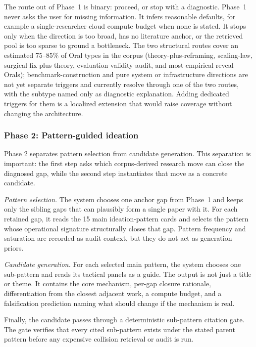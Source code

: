 \documentclass[10pt,a4paper]{article}
\begin{document}
The route out of Phase~1 is binary: proceed, or stop with a diagnostic. Phase~1 never asks the user for missing information. It infers reasonable defaults, for example a single-researcher cloud compute budget when none is stated. It stops only when the direction is too broad, has no literature anchor, or the retrieved pool is too sparse to ground a bottleneck. The two structural routes cover an estimated 75--85\% of Oral types in the corpus (theory-plus-reframing, scaling-law, surgical-fix-plus-theory, evaluation-validity-audit, and most empirical-reveal Orals); benchmark-construction and pure system or infrastructure directions are not yet separate triggers and currently resolve through one of the two routes, with the subtype named only as diagnostic explanation. Adding dedicated triggers for them is a localized extension that would raise coverage without changing the architecture.

\subsubsection{Phase 2: Pattern-guided ideation}

Phase 2 separates pattern selection from candidate generation. This separation is important: the first step asks which corpus-derived research move can close the diagnosed gap, while the second step instantiates that move as a concrete candidate.

\emph{Pattern selection.} The system chooses one anchor gap from Phase~1 and keeps only the sibling gaps that can plausibly form a single paper with it. For each retained gap, it reads the 15 main ideation-pattern cards and selects the pattern whose operational signature structurally closes that gap. Pattern frequency and saturation are recorded as audit context, but they do not act as generation priors.

\emph{Candidate generation.} For each selected main pattern, the system chooses one sub-pattern and reads its tactical panels as a guide. The output is not just a title or theme. It contains the core mechanism, per-gap closure rationale, differentiation from the closest adjacent work, a compute budget, and a falsification prediction naming what should change if the mechanism is real.

Finally, the candidate passes through a deterministic sub-pattern citation gate. The gate verifies that every cited sub-pattern exists under the stated parent pattern before any expensive collision retrieval or audit is run.
\end{document}
